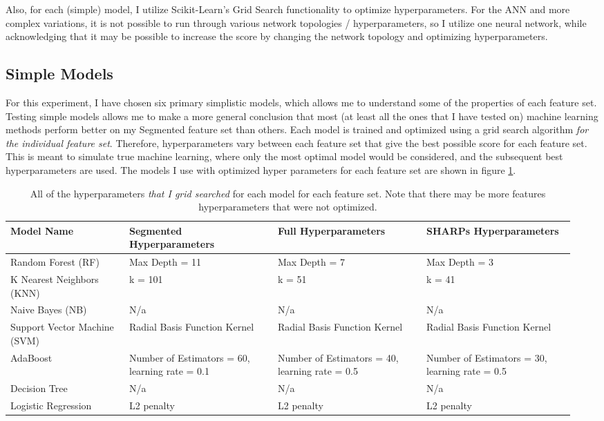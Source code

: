 \documentclass[defaultstyle,11pt]{thesis}
\begin{document}
Also, for each (simple) model, I utilize Scikit-Learn's Grid Search functionality to optimize hyperparameters. For the ANN and more complex variations, it is not possible to run through various network topologies / hyperparameters, so I utilize one neural network, while acknowledging that it may be possible to increase the score by changing the network topology and optimizing hyperparameters.

\subsection{Simple Models}

For this experiment, I have chosen six primary simplistic models, which allows me to understand some of the properties of each feature set. Testing simple models allows me to make a more general conclusion that most (at least all the ones that I have tested on) machine learning methods perform better on my Segmented feature set than others. Each model is trained and optimized using a grid search algorithm \textit{for the individual feature set}. Therefore, hyperparameters vary between each feature set that give the best possible score for each feature set. This is meant to simulate true machine learning, where only the most optimal model would be considered, and the subsequent best hyperparameters are used. The models I use with optimized hyper parameters for each feature set are shown in figure \ref{tab:hyperparameterssmall}.
\begin{table}[p]
    \centering
    \begin{tabular}{|p{0.2\linewidth}|p{0.25\linewidth}|p{0.25\linewidth}|p{0.25\linewidth}|}
        \hline
         \textbf{Model Name} & \textbf{Segmented Hyperparameters} & \textbf{Full Hyperparameters} & \textbf{SHARPs Hyperparameters} \\
         \hline
         Random Forest (RF) & Max Depth = 11 & Max Depth = 7 & Max Depth = 3 \\
         \hline
         K Nearest Neighbors (KNN) & k = 101 & k = 51 & k = 41 \\
         \hline
         Naive Bayes (NB) & N/a & N/a & N/a \\
         \hline
         Support Vector Machine (SVM) & Radial Basis Function Kernel & Radial Basis Function Kernel & Radial Basis Function Kernel \\
         \hline
         AdaBoost & Number of Estimators = 60, learning rate = 0.1 & Number of Estimators = 40, learning rate = 0.5 & Number of Estimators = 30, learning rate = 0.5\\
         \hline
         Decision Tree & N/a & N/a & N/a \\
         \hline
         Logistic Regression & L2 penalty & L2 penalty & L2 penalty \\
         \hline
    \end{tabular}
    \caption{All of the hyperparameters \textit{that I grid searched} for each model for each feature set. Note that there may be more features hyperparameters that were not optimized.}
    \label{tab:hyperparameterssmall}
\end{table}
\end{document}
